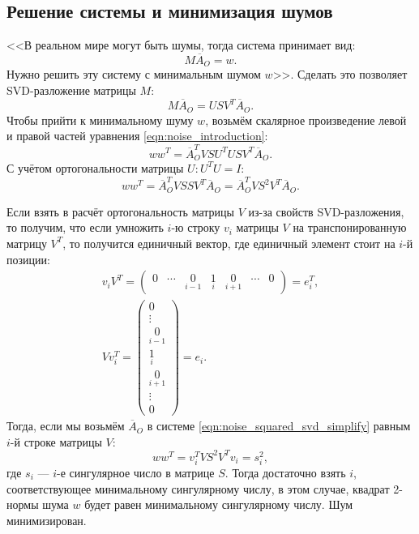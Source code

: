 \documentclass[14pt, a4paper]{extarticle}
\begin{document}
\subsection{Решение системы и минимизация шумов}
<<В реальном мире могут быть шумы, тогда система принимает вид:
\begin{equation}
M \overline{A}_{O} = w.
\label{eqn:noise_introduction}
\end{equation}
Нужно решить эту систему с минимальным шумом $w$\cite{dlt_temugeb}>>. Сделать это позволяет
SVD-разложение матрицы $M$:
\begin{equation}
    M \overline{A}_O = U S V^T \overline{A}_O.
\label{eqn:dlt-two-cameras-matrix}
\end{equation}
Чтобы прийти к минимальному шуму $w$, возьмём скалярное произведение левой и правой частей уравнения \eqref{eqn:noise_introduction}:
\begin{equation}
    w w^T =   \overline{A}_O^T V S U^T U S V^T \overline{A}_O.
\end{equation}
С учётом ортогональности матрицы $U: U^T U = I$:
\begin{equation}
    w w^T = \overline{A}_O^T V S S V^T \overline{A}_O = 
    \overline{A}_O^T V S^2 V^T \overline{A}_O.
\label{eqn:noise_squared_svd_simplify}
\end{equation}

Если взять в расчёт ортогональность матрицы $V$ из-за свойств SVD-раз\-ло\-же\-ния,
то получим, что если умножить $i$-ю строку $v_i$ матрицы $V$ на
транспонированную матрицу $V^T$, то получится единичный вектор, где единичный
элемент стоит на $i$-й позиции:
\begin{equation}
\begin{gathered}
    v_i V^T = \begin{pmatrix}
        0 & \cdots & \underset{i-1}{0} & \underset{i}{1} & \underset{i+1}{0} & \cdots & 0
    \end{pmatrix} = e_i^T, \\
    V v_i^T = \begin{pmatrix}
        0 \\
        \vdots \\
        \underset{i-1}{0}\\
        \underset{i}{1}\\
        \underset{i+1}{0}\\
        \vdots\\
        0
    \end{pmatrix} = e_i.
\end{gathered}
\end{equation}
Тогда, если мы возьмём $\overline{A}_O$ в системе
\eqref{eqn:noise_squared_svd_simplify} равным $i$-й строке матрицы $V$:
\begin{equation}
    w w^T = v_i^T V S^2 V^T v_i = s_i^2,
\end{equation}
где $s_i$ --- $i$-е сингулярное число в матрице $S$. Тогда достаточно взять $i$,
соответствующее минимальному сингулярному числу, в этом случае, квадрат 2-нормы
шума $w$ будет равен минимальному сингулярному числу. Шум минимизирован.
\end{document}
